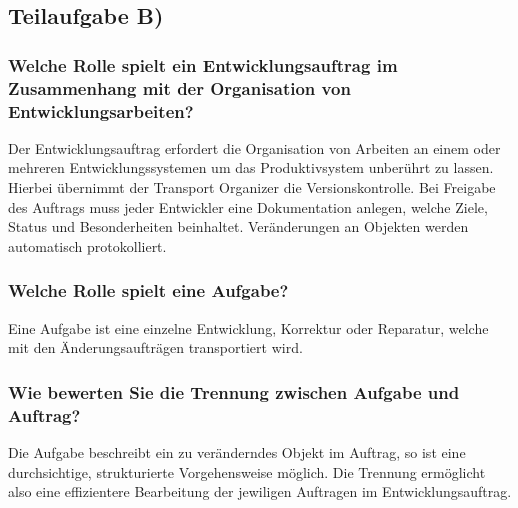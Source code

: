 \subsection{Teilaufgabe B)}
\subsubsection{Welche Rolle spielt ein Entwicklungsauftrag im Zusammenhang mit der Organisation von
Entwicklungsarbeiten?}

Der Entwicklungsauftrag erfordert die Organisation von Arbeiten an einem oder
mehreren Entwicklungssystemen um das Produktivsystem unberührt zu lassen.
Hierbei übernimmt der Transport Organizer die Versionskontrolle. Bei Freigabe
des Auftrags muss jeder Entwickler eine Dokumentation anlegen, welche Ziele,
Status und Besonderheiten beinhaltet. Veränderungen an Objekten werden
automatisch protokolliert.

\subsubsection{Welche Rolle spielt eine Aufgabe?} 
Eine Aufgabe ist eine einzelne Entwicklung, Korrektur oder Reparatur, welche mit
den Änderungsaufträgen transportiert wird.

\subsubsection{Wie bewerten Sie die Trennung zwischen Aufgabe und Auftrag?} 
Die Aufgabe beschreibt ein zu veränderndes Objekt im Auftrag, so ist eine
durchsichtige, strukturierte Vorgehensweise möglich. Die Trennung ermöglicht
also eine effizientere Bearbeitung der jewiligen Auftragen im
Entwicklungsauftrag.

\clearpage
